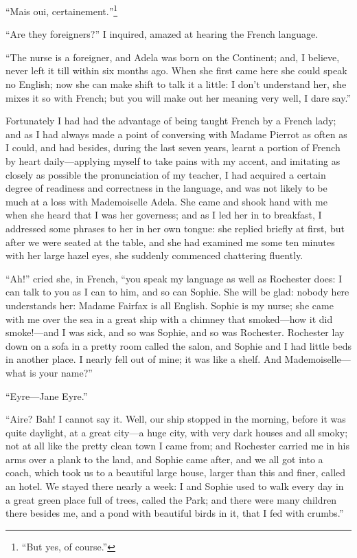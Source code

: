 \foreignquote{french}{Mais oui, certainement.}\footnote{\enquote{But yes, of course.}}

\enquote{Are they foreigners?} I inquired, amazed at hearing the French
language.

\enquote{The nurse is a foreigner, and Adela was born on the Continent;
and, I believe, never left it till within six months ago. When she
first came here she could speak no English; now she can make shift to
talk it a little: I don't understand her, she mixes it so with French;
but you will make out her meaning very well, I dare say.}

Fortunately I had had the advantage of being taught French by a French
lady; and as I had always made a point of conversing with Madame Pierrot
as often as I could, and had besides, during the last seven years,
learnt a portion of French by heart daily---applying myself to take
pains with my accent, and imitating as closely as possible the
pronunciation of my teacher, I had acquired a certain degree of
readiness and correctness in the language, and was not likely to be much
at a loss with Mademoiselle Adela. She came and shook hand with me when
she heard that I was her governess; and as I led her in to breakfast, I
addressed some phrases to her in her own tongue: she replied briefly at
first, but after we were seated at the table, and she had examined me
some ten minutes with her large hazel eyes, she suddenly commenced
chattering fluently.

\enquote{Ah!} cried she, in French, \enquote{you speak my language as
well as \Mr{} Rochester does: I can talk to you as I can to him, and so
can Sophie. She will be glad: nobody here understands her: Madame
Fairfax is all English. Sophie is my nurse; she came with me over the
sea in a great ship with a chimney that smoked---how it did smoke!---and
I was sick, and so was Sophie, and so was \Mr{} Rochester. \Mr{} Rochester
lay down on a sofa in a pretty room called the salon, and Sophie and I
had little beds in another place. I nearly fell out of mine; it was
like a shelf. And Mademoiselle---what is your name?}

\enquote{Eyre---Jane Eyre.}

\enquote{Aire? Bah! I cannot say it. Well, our ship stopped in the
morning, before it was quite daylight, at a great city---a huge city,
with very dark houses and all smoky; not at all like the pretty clean
town I came from; and \Mr{} Rochester carried me in his arms over a plank
to the land, and Sophie came after, and we all got into a coach, which
took us to a beautiful large house, larger than this and finer, called
an hotel. We stayed there nearly a week: I and Sophie used to walk
every day in a great green place full of trees, called the Park; and
there were many children there besides me, and a pond with beautiful
birds in it, that I fed with crumbs.}

